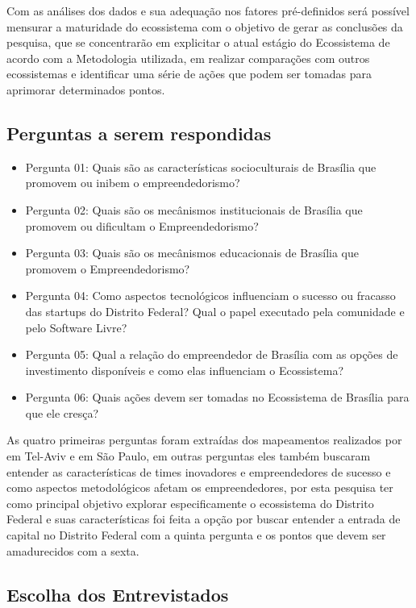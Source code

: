 Com as análises dos dados e sua adequação nos fatores pré-definidos será possível mensurar a maturidade do ecossistema com o objetivo de gerar as conclusões da pesquisa, que se concentrarão em explicitar o atual estágio do Ecossistema de acordo com a Metodologia utilizada, em realizar comparações com outros ecossistemas e identificar uma série de ações que podem ser tomadas para aprimorar determinados pontos.

\subsection{Perguntas a serem respondidas}
\label{subsection:questoes_de_pesquisa}

\begin{itemize}
  \item Pergunta 01: Quais são as características socioculturais de Brasília que promovem ou inibem o empreendedorismo?
  \item Pergunta 02: Quais são os mecânismos institucionais de Brasília que promovem ou dificultam o Empreendedorismo?
  \item Pergunta 03: Quais são os mecânismos educacionais de Brasília que promovem o Empreendedorismo?
  \item Pergunta 04: Como aspectos tecnológicos influenciam o sucesso ou fracasso das startups do Distrito Federal? Qual o papel executado pela comunidade e pelo Software Livre?
  \item Pergunta 05: Qual a relação do empreendedor de Brasília com as opções de investimento disponíveis e como elas influenciam o Ecossistema?
  \item Pergunta 06: Quais ações devem ser tomadas no Ecossistema de Brasília para que ele cresça?
\end{itemize}

As quatro primeiras perguntas foram extraídas dos mapeamentos realizados por  em Tel-Aviv e  em São Paulo, em outras perguntas eles também buscaram entender as características de times inovadores e empreendedores de sucesso e como aspectos metodológicos afetam os empreendedores, por esta pesquisa ter como principal objetivo explorar especificamente o ecossistema do Distrito Federal e suas características foi feita a opção por buscar entender a entrada de capital no Distrito Federal com a quinta pergunta e os pontos que devem ser amadurecidos com a sexta.

\subsection{Escolha dos Entrevistados}
\label{subsection:escolha_dos_entrevistados}

